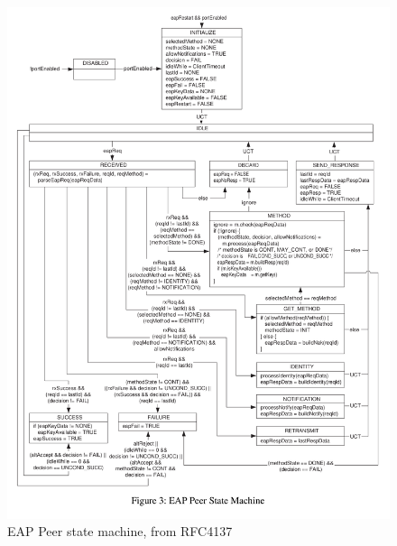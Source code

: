 \documentclass{amsart}
\begin{document}
\begin{figure}
  \centering \includegraphics{res/eap-peer-state-machine-rfc4137.png}
  \caption{EAP Peer state machine, from RFC4137}
\end{figure}
\end{document}
